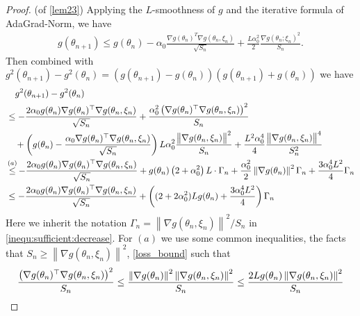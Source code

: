 \documentclass[standalone]{article}
\begin{document}
\begin{proof}(of \cref{lem23})
Applying the $ L$-smoothness of $g$ and the iterative formula of AdaGrad-Norm, we have 
\begin{align}\label{inequ:smoothness:g}
g(\theta_{n+1}) \leq g(\theta_n)- \alpha_0 \frac{\nabla g(\theta_n)^{T}\nabla g(\theta_n,\xi_n)}{\sqrt{S_n}} + \frac{ L\alpha_0^2}{2}\frac{\nabla g(\theta_n; \xi_n)^2}{S_n}.
\end{align}
Then combined with $g^{2}(\theta_{n+1})-g^{2}(\theta_{n}) = \left(g(\theta_{n+1})-g(\theta_{n}) \right)\left(g(\theta_{n+1})+g(\theta_{n}) \right)$ we have
\begin{align}\label{inequ:sufifient:v2:1}
& \quad g^{2}(\theta_{n+1})-g^{2}(\theta_{n}) \notag \\ &\le -\frac{2\alpha_{0}g(\theta_{n})\nabla g(\theta_{n})^{\top}\nabla g(\theta_{n},\xi_{n})}{\sqrt{S_{n}}}+ \frac{\alpha_0^2\left(\nabla g(\theta_{n})^{\top}\nabla g(\theta_{n},\xi_{n})\right)^2}{S_n} \notag 
\\& \quad +\left(g(\theta_{n}) - \frac{\alpha_0\nabla g(\theta_{n})^{\top}\nabla g(\theta_{n},\xi_{n})}{\sqrt{S_{n}}}\right) L\alpha_{0}^{2}\frac{\big\|\nabla g(\theta_{n},\xi_{n})\big\|^{2}}{S_{n}} +  \frac{ L^2\alpha_0^4}{4}\frac{\big\|\nabla g(\theta_{n},\xi_{n})\big\|^{4}}{S_{n}^2}  \notag \\
& \mathop{\leq}^{(a)} -\frac{2\alpha_{0}g(\theta_{n})\nabla g(\theta_{n})^{\top}\nabla g(\theta_{n},\xi_{n})}{\sqrt{S_{n}}} + g(\theta_n)\left(2+\alpha_0^2 \right) L\cdot\Gamma_n   + \frac{\alpha_0^2}{2}\left\| \nabla g(\theta_n)\right\|^2\Gamma_n  + \frac{3\alpha_0^4 L^2}{4}\Gamma_n  \notag \\
& \leq -\frac{2\alpha_{0}g(\theta_{n})\nabla g(\theta_{n})^{\top}\nabla g(\theta_{n},\xi_{n})}{\sqrt{S_{n}}} + \left((2+2\alpha_0^2) Lg(\theta_n) + \frac{3\alpha_0^4 L^2}{4} \right)\Gamma_n 
\end{align} 
Here we inherit the notation $\Gamma_n = \left\|\nabla g(\theta_n, \xi_n) \right\|^2/S_n$ in \cref{inequ:sufficient:decrease}. For $(a)$ we use some common inequalities, the facts that  $S_n \geq \left\|\nabla g(\theta_{n},\xi_{n}) \right\|^2$, \cref{loss_bound} such that
\begin{align}
\frac{\left(\nabla g(\theta_{n})^{\top}\nabla g(\theta_{n},\xi_{n})\right)^2}{S_n} &  
\leq \frac{\left\|\nabla g(\theta_{n}) \right\|^2\left\|\nabla g(\theta_{n},\xi_{n}) \right\|^2}{S_n} \leq \frac{2 Lg(\theta_n)\left\|\nabla g(\theta_{n},\xi_{n}) \right\|^2}{S_n} \notag \\

\end{align}
\end{proof}
\end{document}
